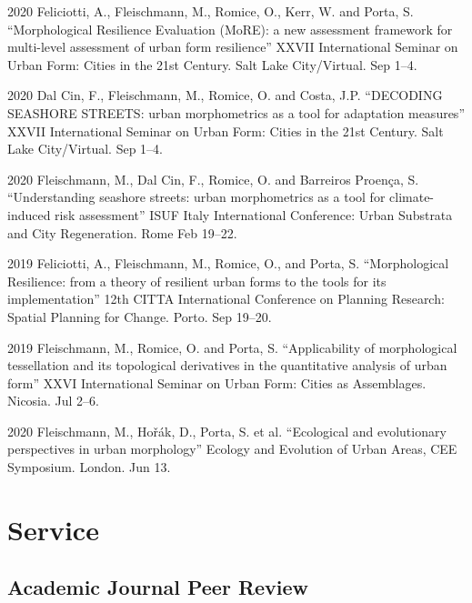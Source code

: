\documentclass[12pt,a4paper]{report}
\begin{document}
\begin{tablist}
        \item[2020] \tab{}Feliciotti, A., Fleischmann, M., Romice, O., Kerr, W. and Porta, S. \enquote{Morphological Resilience Evaluation (MoRE): a new assessment framework for multi-level assessment of urban form resilience} XXVII International Seminar on Urban Form: Cities in the 21st Century. Salt Lake City/Virtual. \@ Sep 1--4.

        \item[2020] \tab{}Dal Cin, F., Fleischmann, M., Romice, O. and Costa, J.P. \enquote{DECODING SEASHORE STREETS: urban morphometrics as a tool for adaptation measures} XXVII International Seminar on Urban Form: Cities in the 21st Century. Salt Lake City/Virtual. \@ Sep 1--4.

        \item[2020] \tab{}Fleischmann, M., Dal Cin, F., Romice, O. and Barreiros Proença, S. \enquote{Understanding seashore streets: urban morphometrics as a tool for climate-induced risk assessment} ISUF Italy International Conference: Urban Substrata and City Regeneration. Rome \@ Feb 19--22.

        \item[2019] \tab{}Feliciotti, A., Fleischmann, M., Romice, O., and Porta, S.  \enquote{Morphological Resilience: from a theory of resilient urban forms to the tools for its implementation} 12th CITTA International Conference on Planning Research: Spatial Planning for Change. Porto. \@ Sep 19--20.

        \item[2019] \tab{}Fleischmann, M., Romice, O. and Porta, S. \enquote{Applicability of morphological tessellation and its topological derivatives in the quantitative analysis of urban form} XXVI International Seminar on Urban Form: Cities as Assemblages. Nicosia. \@ Jul 2--6.

        \item[2020] \tab{}Fleischmann, M., Hořák, D., Porta, S. et al. \enquote{Ecological and evolutionary perspectives in urban morphology} Ecology and Evolution of Urban Areas, CEE Symposium. London. \@ Jun 13.


    \end{tablist}


    \section*{Service}

    \subsection*{Academic Journal Peer Review}
\end{document}
